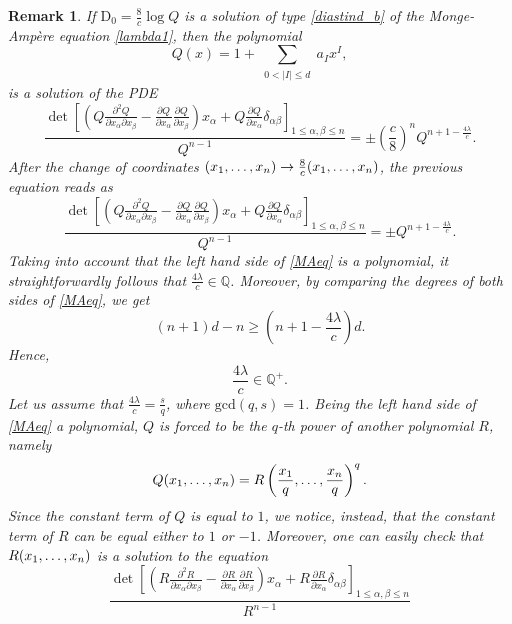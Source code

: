 \documentclass[11pt, reqno]{amsart}
\newtheorem{rem}[theor]{Remark}
\newcommand{\Q}{\mathds{Q}}
\newcommand{\dd}{\mathrm{D}}
\begin{document}
\begin{rem}\label{l1}
If $\dd_0=\frac{8}{c} \log Q$ is a solution of type  \eqref{diastind_b} of the Monge-Ampère equation \eqref{lambda1}, then the polynomial
\begin{equation}\label{eq.Px} 
Q(x)=1+\sum_{\substack{ 0<|I|\leq d}} a_I x^I,
\end{equation} 
is a solution of the PDE
\begin{equation*} 
\frac{\det\left[\left(Q \frac{\partial^2 Q}{\partial{x_\alpha}\partial{x_\beta}}-\frac{\partial Q}{\partial{x_\alpha}}\frac{\partial Q}{\partial{x_\beta}}\right)x_\alpha+Q\frac{\partial Q}{\partial{x_\alpha}} \delta_{\alpha\beta}\right]_{1\leq\alpha,\beta\leq n}}{Q^{n-1}}=\pm\left(\frac{c}{8}\right)^n Q^{n+1-\frac{4\lambda}{c}}.
\end{equation*}
After the change of coordinates $(x_1,\mathellipsis,x_n)\to \frac{8}{c}(x_1,\mathellipsis,x_n)$, the previous equation reads as 
\begin{equation}\label{MAeq} 
\frac{\det\left[\left(Q \frac{\partial^2 Q}{\partial{x_\alpha}\partial{x_\beta}}-\frac{\partial Q}{\partial{x_\alpha}}\frac{\partial Q}{\partial{x_\beta}}\right)x_\alpha+Q\frac{\partial Q}{\partial{x_\alpha}} \delta_{\alpha\beta}\right]_{1\leq\alpha,\beta\leq n}}{Q^{n-1}}=\pm Q^{n+1-\frac{4\lambda}{c}}.
\end{equation}
Taking into account that the left hand side of \eqref{MAeq} is a polynomial, it straightforwardly follows that 
$\frac{4\lambda}{c}\in\Q$. Moreover, by comparing the degrees of both sides of  \eqref{MAeq}, we get 
$$(n+1)d-n \geq \left(n+1-\frac{4\lambda}{c}\right)d.$$
Hence, $$\frac{4\lambda}{c}\in\Q^+.$$
%
Let us assume that $\frac{4\lambda }{c}=\frac{s}{q}$, where $\mathrm{gcd}(q,s)=1$. Being  the left hand side of \eqref{MAeq} a polynomial, $Q$ is forced to be the $q$-th power of another polynomial $R$, namely 
$$Q(x_1,\mathellipsis,x_n)=R\left(\frac{x_1}{q},\mathellipsis,\frac{x_n}{q}\right)^q.$$
Since the constant term of $Q$ is equal to $1$, we notice, instead, that the constant term of $R$ can be  equal either to  $1$ or $-1$.
Moreover, one can easily check that $R(x_1,\mathellipsis,x_n)$ is a solution to the equation
\begin{equation}\label{MA**}
\frac{\det\left[\left(R \frac{\partial^2 R}{\partial{x_\alpha}\partial{x_\beta}}-\frac{\partial R}{\partial{x_\alpha}}\frac{\partial R}{\partial{x_\beta}}\right)x_\alpha+R\frac{\partial R}{\partial{x_\alpha}} \delta_{\alpha\beta}\right]_{1\leq\alpha,\beta\leq n}}{R^{n-1}}%

\end{equation}
\end{rem}
\end{document}
